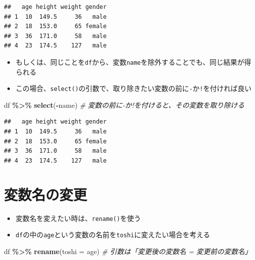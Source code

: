 \documentclass[
]{book}
\newenvironment{Shaded}{\begin{snugshade}}{\end{snugshade}}
\newcommand{\AttributeTok}[1]{\textcolor[rgb]{0.13,0.29,0.53}{#1}}
\newcommand{\CommentTok}[1]{\textcolor[rgb]{0.56,0.35,0.01}{\textit{#1}}}
\newcommand{\FunctionTok}[1]{\textcolor[rgb]{0.13,0.29,0.53}{\textbf{#1}}}
\newcommand{\NormalTok}[1]{#1}
\newcommand{\SpecialCharTok}[1]{\textcolor[rgb]{0.81,0.36,0.00}{\textbf{#1}}}
\providecommand{\tightlist}{%
  \setlength{\itemsep}{0pt}\setlength{\parskip}{0pt}}
\begin{document}
\begin{verbatim}
##   age height weight gender
## 1  10  149.5     36   male
## 2  18  153.0     65 female
## 3  36  171.0     58   male
## 4  23  174.5    127   male
\end{verbatim}

\begin{itemize}
\tightlist
\item
  もしくは、同じことを\texttt{df}から、変数\texttt{name}を除外することでも、同じ結果が得られる
\item
  この場合、\texttt{select()}の引数で、取り除きたい変数の前に\texttt{-}か\texttt{!}を付ければ良い
\end{itemize}

\begin{Shaded}
\begin{Highlighting}[]
\NormalTok{df }\SpecialCharTok{\%\textgreater{}\%} 
  \FunctionTok{select}\NormalTok{(}\SpecialCharTok{{-}}\NormalTok{name) }\CommentTok{\# 変数の前に{-}か!を付けると、その変数を取り除ける}
\end{Highlighting}
\end{Shaded}

\begin{verbatim}
##   age height weight gender
## 1  10  149.5     36   male
## 2  18  153.0     65 female
## 3  36  171.0     58   male
## 4  23  174.5    127   male
\end{verbatim}

\hypertarget{ux5909ux6570ux540dux306eux5909ux66f4}{%
\section{変数名の変更}\label{ux5909ux6570ux540dux306eux5909ux66f4}}

\begin{itemize}
\tightlist
\item
  変数名を変えたい時は、\texttt{rename()}を使う
\item
  \texttt{df}の中の\texttt{age}という変数の名前を\texttt{toshi}に変えたい場合を考える
\end{itemize}

\begin{Shaded}
\begin{Highlighting}[]
\NormalTok{df }\SpecialCharTok{\%\textgreater{}\%} 
  \FunctionTok{rename}\NormalTok{(}\AttributeTok{toshi =}\NormalTok{ age) }\CommentTok{\# 引数は「変更後の変数名 = 変更前の変数名」}
\end{Highlighting}
\end{Shaded}
\end{document}
